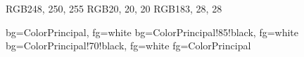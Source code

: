 %


%
\usepackage{xcolor}
\definecolor{ColorFondo}    {RGB}{248, 250, 255}  %
\definecolor{ColorTexto}    {RGB}{20,  20,  20}   %
\definecolor{ColorAlerta}   {RGB}{183, 28,  28}   %


\usepackage[utf8]{inputenc}
\usepackage[T1]{fontenc}
\usepackage[spanish,es-tabla,es-nodecimaldot]{babel}
\usepackage{csquotes}
\usepackage{microtype}
\usepackage{lmodern}       %



   {bg=ColorPrincipal, fg=white}
 {bg=ColorPrincipal!85!black, fg=white}
  {bg=ColorPrincipal!70!black, fg=white}
         {fg=ColorPrincipal}

